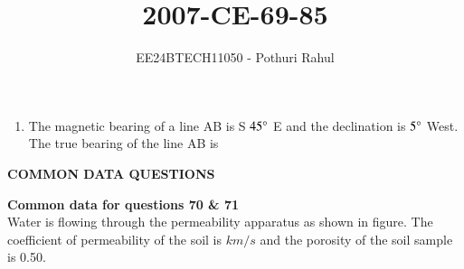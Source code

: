 \documentclass[journal]{IEEEtran}
\begin{document}

\vspace{3cm}
\title{2007-CE-69-85}
\author{EE24BTECH11050 - Pothuri Rahul}
{\let\newpage\relax\maketitle}
\renewcommand{\thefigure}{\theenumi}
\renewcommand{\thetable}{\theenumi}
\setlength{\intextsep}{10pt} %
\renewcommand{\thetable}{\theenumi}
\begin{enumerate}[start=69]
\item %
The magnetic bearing of a line AB is S $45\degree$ E and the declination is $5\degree$ West. The true bearing of the line AB is 
\begin{enumerate}
\end{enumerate}
\end{enumerate}
\begin{center}
    \textbf{COMMON DATA QUESTIONS}
\end{center}
\textbf{Common data for questions 70 \& 71 }\\
Water is flowing through the permeability apparatus as shown in figure. The coefficient of permeability of the soil is $k m/s$ and the porosity of the soil sample is 0.50.
\end{document}
